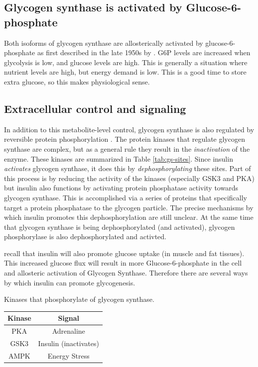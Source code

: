 \documentclass{tufte-handout}
\begin{document}
\subsection{Glycogen synthase is activated by Glucose-6-phosphate}

Both isoforms of glycogen synthase are allosterically activated by glucose-6-phosphate as first described in the late 1950s by \citet{Leloir1959}.  G6P levels are increased when glycolysis is low, and glucose levels are high.  This is generally a situation where nutrient levels are high, but energy demand is low.  This is a good time to store extra glucose, so this makes physiological sense.

\subsection{Extracellular control and signaling}

In addition to this metabolite-level control, glycogen synthase is also regulated by reversible protein phosphorylation \citep{Larner1960}.  The protein kinases that regulate glycogen synthase are complex, but as a general rule they result in the \emph{inactivation} of the enzyme.  These kinases are summarized in Table \ref{tab:gs-sites}.  Since insulin \emph{activates} glycogen synthase, it does this by \emph{dephosphorylating} these sites.  Part of this process is by reducing the activity of the kinases (especially GSK3 and PKA) but insulin also functions by activating protein phosphatase activity towards glycogen synthase.  This is accomplished via a series of proteins that specifically target a protein phosphatase to the glycogen particle.  The precise mechanisms by which insulin promotes this dephosphorylation are still unclear.  At the same time that glycogen synthase is being dephosphorylated (and activated), glycogen phosphorylase is also dephosphorylated and activted.

 recall that insulin will also promote glucose uptake (in muscle and fat tissues).  This increased glucose flux will result in more Glucose-6-phosphate in the cell and allosteric activation of Glycogen Synthase.  Therefore there are several ways by which insulin can promote glycogenesis.

\begin{margintable}
\centering
\caption{Kinases that phosphorylate of glycogen synthase.}
\label{tab:gs-sites}
\begin{tabular}{cc}
\hline
\textbf {Kinase} & \textbf{Signal}  \\
\hline
PKA & Adrenaline \\
GSK3 & Insulin (inactivates) \\
AMPK & Energy Stress \\
\hline
\end{tabular}
\end{margintable}
\end{document}
